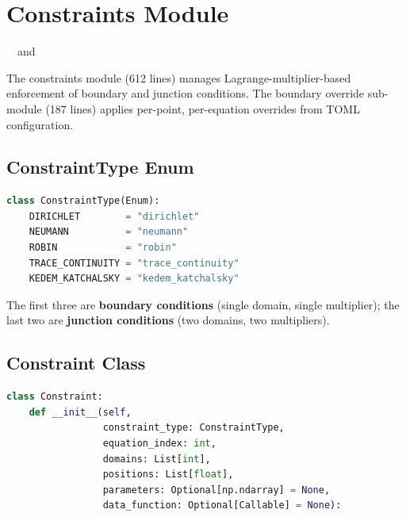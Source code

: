 \section{Constraints Module}
\label{sec:constraints}

\begin{center}
 ~~and~~ 
\end{center}

The constraints module (612 lines) manages Lagrange-multiplier-based enforcement of boundary and junction conditions.  The boundary override sub-module (187 lines) applies per-point, per-equation overrides from TOML configuration.

\subsection{ConstraintType Enum}

\begin{lstlisting}[language=Python, caption={Constraint types}]
class ConstraintType(Enum):
    DIRICHLET        = "dirichlet"
    NEUMANN          = "neumann"
    ROBIN            = "robin"
    TRACE_CONTINUITY = "trace_continuity"
    KEDEM_KATCHALSKY = "kedem_katchalsky"
\end{lstlisting}

The first three are \textbf{boundary conditions} (single domain, single multiplier); the last two are \textbf{junction conditions} (two domains, two multipliers).

\subsection{Constraint Class}

\begin{lstlisting}[language=Python, caption={Constraint constructor}]
class Constraint:
    def __init__(self, 
                 constraint_type: ConstraintType,
                 equation_index: int,
                 domains: List[int],
                 positions: List[float],
                 parameters: Optional[np.ndarray] = None,
                 data_function: Optional[Callable] = None):
\end{lstlisting}

